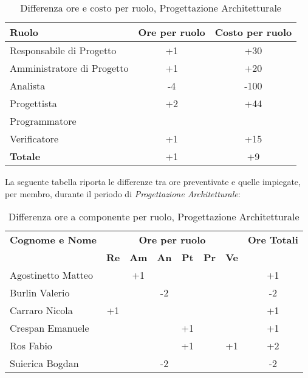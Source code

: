 \begin{table}[h]
	\centering
	\begin{tabular}{|l|c|c|}
		\toprule
		\textbf{Ruolo} & \textbf{Ore per ruolo} & \textbf{Costo per ruolo} \\
		
		\midrule
		Responsabile di Progetto & +1 & +30 \\
		Amministratore di Progetto & +1 & +20 \\ 
		Analista & -4 & -100 \\
		Progettista & +2 & +44 \\
		Programmatore & & \\
		Verificatore & +1 & +15 \\
		\midrule
		\textbf{Totale} & +1 & +9 \\
		
		\bottomrule
	\end{tabular}
	\caption{Differenza ore e costo per ruolo, Progettazione Architetturale}
	\label{tab5}
\end{table} 

\noindent La seguente tabella riporta le differenze tra ore preventivate e quelle impiegate, per membro, durante il periodo di \textit{Progettazione Architetturale}: 
\begin{table}[h]
	\centering
	\begin{tabular}{|l|c|c|c|c|c|c|c|}
		\toprule
		\textbf{Cognome e Nome} & \multicolumn{6}{c}{\textbf{Ore per ruolo}} & \textbf{Ore Totali} \\
		& \textbf{Re} & \textbf{Am} & \textbf{An} & \textbf{Pt} & \textbf{Pr} & \textbf{Ve} & \\
		
		\midrule
		Agostinetto Matteo & & +1 & & & & & +1 \\
		Burlin Valerio & & & -2 & & & & -2 \\ 
		Carraro Nicola & +1 & & & & & & +1 \\
		Crespan Emanuele & & & & +1 & & & +1 \\
		Ros Fabio & & & & +1 & & +1 & +2 \\
		Suierica Bogdan & & & -2 & & & & -2 \\
		
		\bottomrule
	\end{tabular}
	\caption{Differenza ore a componente per ruolo, Progettazione Architetturale}
\end{table}

